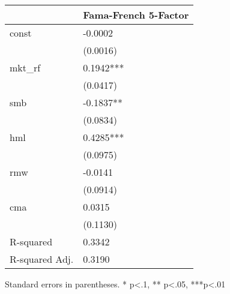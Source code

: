 \begin{table}
\caption{}
\label{}
\begin{center}
\begin{tabular}{ll}
\hline
               & Fama-French 5-Factor  \\
\hline
const          & -0.0002               \\
               & (0.0016)              \\
mkt\_rf        & 0.1942***             \\
               & (0.0417)              \\
smb            & -0.1837**             \\
               & (0.0834)              \\
hml            & 0.4285***             \\
               & (0.0975)              \\
rmw            & -0.0141               \\
               & (0.0914)              \\
cma            & 0.0315                \\
               & (0.1130)              \\
R-squared      & 0.3342                \\
R-squared Adj. & 0.3190                \\
\hline
\end{tabular}
\end{center}
\end{table}
\bigskip
Standard errors in parentheses. \newline 
* p<.1, ** p<.05, ***p<.01